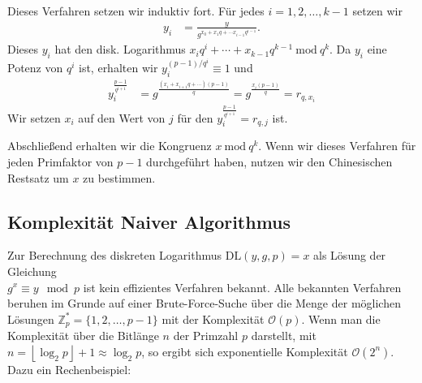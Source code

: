 \documentclass[
  a4paper,
  11pt,
]{scrartcl}
\theoremstyle{plain}
\theoremstyle{definition}
\theoremstyle{remark}
\newcommand{\Z}{\mathbb{Z}}
\newcommand{\Mod}[1]{\ \mathrm{mod}\ #1}
\begin{document}
Dieses Verfahren setzen wir induktiv fort. Für jedes $i = 1, 2, \ldots, k-1$
setzen wir
\begin{align*}
  y_i & = \frac{y}{g^{x_0 + x_1 q + \cdots x_{i-1} q^{i-1}}}.
\end{align*}
Dieses $y_i$ hat den disk. Logarithmus
$x_i q^i + \cdots + x_{k-1} q^{k-1} \Mod{q^k}$. Da $y_i$ eine Potenz von $q^i$
ist, erhalten wir $y_i^{(p-1)/q^i} \equiv 1$ und
\begin{align*}
  y_i^{\frac{p-1}{q^{i+1}}} &
    = g^{\frac{(x_i + x_{i+1} q + \cdots) (p-1)}{q}}
    = g^{\frac{x_i (p-1)}{q}}
    = r_{q, x_i}
\end{align*}
Wir setzen $x_i$ auf den Wert von $j$ für den
$y_i^{\frac{p-1}{q^{i+1}}} = r_{q, j}$ ist.

Abschließend erhalten wir die Kongruenz $x \Mod{q^k}$. Wenn wir dieses Verfahren
für jeden Primfaktor von $p-1$ durchgeführt haben, nutzen wir den Chinesischen
Restsatz um $x$ zu bestimmen.


\subsection{Komplexität Naiver Algorithmus}
\label{sub:komplexitaet_naiver_algorithmus}

Zur Berechnung des diskreten Logarithmus $\text{DL}(y,g,p) = x$ als Lösung der Gleichung\\
$g^x \equiv y \mod p$ ist kein effizientes Verfahren bekannt. Alle bekannten
Verfahren beruhen im Grunde auf einer Brute-Force-Suche über die Menge der
möglichen Lösungen $\Z_p^* = \{1, 2, \ldots, p-1\}$ mit der Komplexität
$\mathcal{O}(p)$.
Wenn man die Komplexität über die Bitlänge $n$ der Primzahl $p$ darstellt, mit
$n = \left\lfloor \log_2 p \right\rfloor + 1 \approx \log_2 p$, so ergibt sich
exponentielle Komplexität $\mathcal{O}(2^n)$. Dazu ein Rechenbeispiel:
\end{document}
